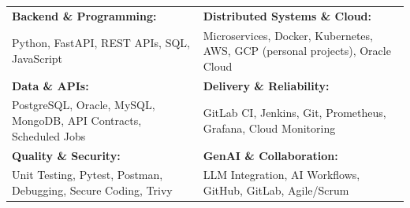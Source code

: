 \renewcommand{\arraystretch}{1.32}

\begin{tabular}{p{} p{}}
    \textbf{Backend \& Programming:} & \textbf{Distributed Systems \& Cloud:} \\
    Python, FastAPI, REST APIs, SQL, JavaScript & Microservices, Docker, Kubernetes, AWS, GCP (personal projects), Oracle Cloud \\

    \textbf{Data \& APIs:} & \textbf{Delivery \& Reliability:} \\
    PostgreSQL, Oracle, MySQL, MongoDB, API Contracts, Scheduled Jobs & GitLab CI, Jenkins, Git, Prometheus, Grafana, Cloud Monitoring \\

    \textbf{Quality \& Security:} & \textbf{GenAI \& Collaboration:} \\
    Unit Testing, Pytest, Postman, Debugging, Secure Coding, Trivy & LLM Integration, AI Workflows, GitHub, GitLab, Agile/Scrum \\
\end{tabular}
